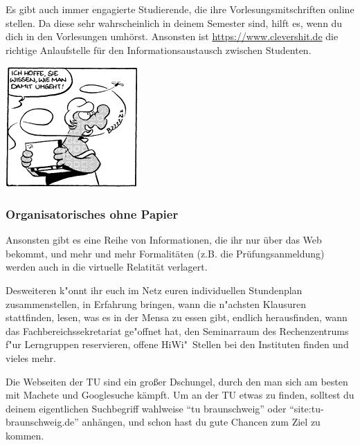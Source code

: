 Es gibt auch immer engagierte Studierende, die ihre Vorlesungsmitschriften online 
stellen. Da diese sehr wahrscheinlich in deinem Semester sind, hilft es, wenn du dich
in den Vorlesungen umhörst. Ansonsten ist \url{https://www.clevershit.de} die richtige
Anlaufstelle für den Informationsaustausch zwischen Studenten.

 \begin{center}
  \centering\includegraphics[width = 0.7\linewidth]{bilder/comics/otto1_2.png}
\end{center}
\subsubsection{Organisatorisches ohne Papier}
Ansonsten gibt es eine Reihe von Informationen, die ihr nur über das Web bekommt, 
und mehr und mehr Formalitäten (z.B. die Prüfungsanmeldung) werden auch in
die virtuelle Relatität verlagert.

Desweiteren k"onnt ihr euch im Netz euren individuellen Stundenplan
zusammenstellen, in Erfahrung bringen, wann die n"achsten Klausuren
stattfinden, lesen, was es in der Mensa zu essen gibt, endlich herausfinden,
wann das Fachbereichssekretariat ge"offnet hat, den Seminarraum des
Rechenzentrums f"ur Lerngruppen reservieren, offene HiWi"~Stellen bei den
Instituten finden und vieles mehr.

Die Webseiten der TU sind ein großer Dschungel, durch den man sich am besten 
mit Machete und Googlesuche kämpft. Um an der TU etwas zu finden, solltest 
du deinem eigentlichen Suchbegriff wahlweise "`tu braunschweig"' oder 
"`site:tu-braunschweig.de"' anhängen, und schon hast du gute Chancen zum Ziel 
zu kommen.

